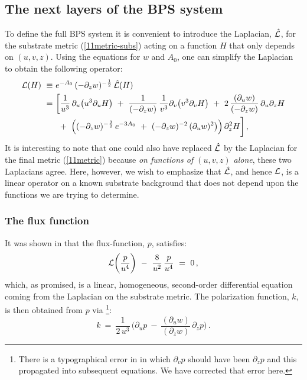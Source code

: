 \documentclass[11pt]{article}
\numberwithin{equation}{section}
\begin{document}
\subsection{The next layers of the BPS system}
\label{ss:BPSlayers}


To define the full BPS system it is convenient to introduce the Laplacian, $\hat {\cal  L}$, for the  substrate metric (\ref{11metric-subs}) acting on a  function  $H$ that only depends on $(u,v,z)$.   Using the equations for $w$ and $A_0$,  one can simplify the Laplacian  to obtain the following operator: 
%
\begin{equation}
\begin{aligned}
{\cal L} ( H) ~\equiv~ &e^{- A_0}\,(-\partial_z w )^{-\frac{1}{2}} \,   \hat {\cal L} ( H)  \\
 ~=~   &   \bigg[  \frac{1}{u^3}\, \partial_u \big( u^3  \partial_u H \big) ~+~  \frac{1}{ (- \partial_z w)}\,  \frac{1}{v^3} \partial_v \big( v^3  \partial_v H \big) ~+~2\, \frac{( \partial_u w)}{ (- \partial_z w)} \, \partial_u \partial_z H     \\
  & ~+~  \Big((-\partial_z  w)^{-\frac{3}{2}} \,e^{-3  A_0}~+~  (-\partial_z  w)^{-2} \,  (\partial_u w)^2\big)\Big)\, \partial_z^2 H \bigg] \,,
\end{aligned}
 \label{Lap1}
\end{equation}
%
It is interesting to note that one could also have replaced $\hat {\cal  L}$ by the Laplacian for the final metric (\ref{11metric}) because {\it on functions of $(u,v,z)$ alone}, these two Laplacians agree. Here, however, we wish to emphasize that $\hat {\cal L}$, and hence ${\cal L}$, is a linear operator on a known substrate background that does not depend upon the functions we are trying to determine. 

\subsubsection{The flux function}
\label{ss:fluxfn}

It was shown in \cite{Bena:2024qed} that the flux-function, $p$, satisfies:
\begin{equation}
{\cal L} \bigg( \frac{p}{u^4}\bigg) ~-~ \frac{8 }{u^2}\, \frac{p}{u^4}~=~  0 \,,
 \label{peqn}
\end{equation}
%
which, as promised, is a linear, homogeneous, second-order differential equation coming from the Laplacian on the substrate metric.   The polarization function, $k$, is then obtained from $p$ via \cite{Bena:2024qed}\footnote{There is a typographical error in  \cite{Bena:2024qed} in which $\partial_v  p$ should have been  $\partial_z  p$ and this propagated into  subsequent equations.  We have corrected that error here.}:
%
\begin{equation}
k ~=~\frac{1}{2\, u^3} \, \bigg(\partial_u p~-~ \frac{(\partial_u w)}{(\partial_z w)}\, \partial_z  p \bigg)    \,.
 \label{kform1}
\end{equation}
%
\end{document}
